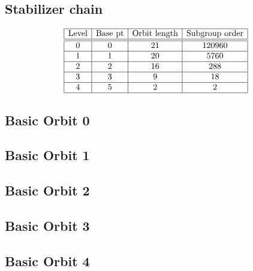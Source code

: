 \subsection*{Stabilizer chain}


$$
\begin{array}{|c|c|c|c|}
\hline
\mbox{Level} & \mbox{Base pt} & \mbox{Orbit length} & \mbox{Subgroup order}\\
\hline
\hline
0 & 0 & 21 & 120960\\
\hline
1 & 1 & 20 & 5760\\
\hline
2 & 2 & 16 & 288\\
\hline
3 & 3 & 9 & 18\\
\hline
4 & 5 & 2 & 2\\
\hline
\end{array}
$$

\subsection*{Basic Orbit 0}



\bigskip

\subsection*{Basic Orbit 1}



\bigskip

\subsection*{Basic Orbit 2}



\bigskip

\subsection*{Basic Orbit 3}



\bigskip

\subsection*{Basic Orbit 4}



